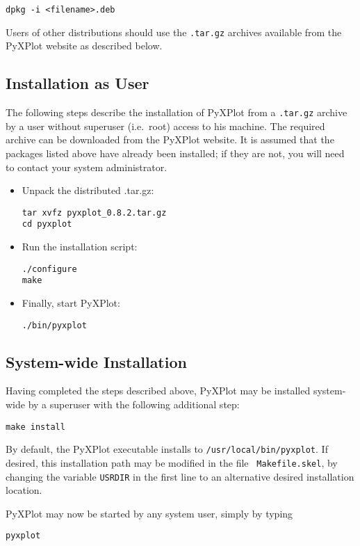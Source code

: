 \begin{verbatim}
dpkg -i <filename>.deb
\end{verbatim}

Users of other distributions should use the {\tt .tar.gz} archives available
from the PyXPlot website as described below.

\subsection{Installation as User}

The following steps describe the installation of PyXPlot from a {\tt .tar.gz}
archive by a user without superuser (i.e.\ root) access to his machine. The
required archive can be downloaded from the PyXPlot website. It is assumed that
the packages listed above have already been installed; if they are not, you
will need to contact your system administrator.

\begin{itemize}
\item Unpack the distributed .tar.gz:

\begin{verbatim}
tar xvfz pyxplot_0.8.2.tar.gz
cd pyxplot
\end{verbatim}

\item Run the installation script:

\begin{verbatim}
./configure
make
\end{verbatim}

\item Finally, start PyXPlot:

\begin{verbatim}
./bin/pyxplot
\end{verbatim}

\end{itemize}

\subsection{System-wide Installation}

Having completed the steps described above, PyXPlot may be installed
system-wide by a superuser with the following additional
step:

\begin{verbatim}
make install
\end{verbatim}

By default, the PyXPlot executable installs to {\tt /usr/local/bin/pyxplot}.
If desired, this installation path may be modified in the file {\tt
Makefile.skel}, by changing the variable {\tt USRDIR} in the first line to an
alternative desired installation location.

PyXPlot may now be started by any system user, simply by typing

\begin{verbatim}
pyxplot
\end{verbatim}

